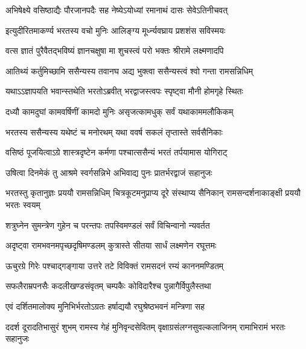 \twolineshloka
{अभिषेक्ष्ये वसिष्ठाद्यैः पौरजानपदैः सह}
{नेष्येऽयोध्यां रमानाथं दासः सेवेऽतिनीचवत्} %

\twolineshloka
{इत्युदीरितमाकर्ण्य भरतस्य वचो मुनिः}
{आलिङ्ग्य मूर्ध्न्यवघ्राय प्रशशंस सविस्मयः} %

\twolineshloka
{वत्स ज्ञातं पुरैवैतद्भविष्यं ज्ञानचक्षुषा}
{मा शुचस्त्वं परो भक्तः श्रीरामे लक्ष्मणादपि} %

\twolineshloka
{आतिथ्यं कर्तुमिच्छामि ससैन्यस्य तवानघ}
{अद्य भुक्त्वा ससैन्यस्त्वं श्वो गन्ता रामसन्निधिम्} %

\twolineshloka
{यथाऽऽज्ञापयति भवान्स्तथेति भरतोऽब्रवीत्}
{भरद्वाजस्त्वपः स्पृष्ट्वा मौनी होमगृहे स्थितः} %

\twolineshloka
{दध्यौ कामदुघां कामवर्षिणीं कामदो मुनिः}
{असृजत्कामधुक् सर्वं यथाकाममलौकिकम्} %

\twolineshloka
{भरतस्य ससैन्यस्य यथेष्टं च मनोरथम्}
{यथा ववर्ष सकलं तृप्तास्ते सर्वसैनिकाः} %

\twolineshloka
{वसिष्ठं पूजयित्वाऽग्रे शास्त्रदृष्टेन कर्मणा}
{पश्चात्ससैन्यं भरतं तर्पयामास योगिराट्} %

\twolineshloka
{उषित्वा दिनमेकं तु आश्रमे स्वर्गसन्निभे}
{अभिवाद्य पुनः प्रातर्भरद्वाजं सहानुजः} %

\threelineshloka
{भरतस्तु कृतानुज्ञः प्रययौ रामसन्निधिम्}
{चित्रकूटमनुप्राप्य दूरे संस्थाप्य सैनिकान्}
{रामसन्दर्शनाकाङ्क्षी प्रययौ भरतः स्वयम्} %

\twolineshloka
{शत्रुघ्नेन सुमन्त्रेण गुहेन च परन्तपः}
{तपस्विमण्डलं सर्वं विचिन्वानो न्यवर्तत} %

\twolineshloka
{अदृष्ट्वा रामभवनमपृच्छदृषिमण्डलम्}
{कुत्रास्ते सीतया सार्धं लक्ष्मणेन रघूत्तमः} %

\twolineshloka
{ऊचुरग्रे गिरेः पश्चाद्गङ्गाया उत्तरे तटे}
{विविक्तं रामसदनं रम्यं काननमण्डितम्} %

\twolineshloka
{सफलैराम्रपनसैः कदलीखण्डसंवृतम्}
{चम्पकैः कोविदारैश्च पुन्नागैर्विपुलैस्तथा} %

\twolineshloka
{एवं दर्शितमालोक्य मुनिभिर्भरतोऽग्रतः}
{हर्षाद्ययौ रघुश्रेष्ठभवनं मन्त्रिणा सह} %

\fourlineindentedshloka
{ददर्श दूरादतिभासुरं शुभम्}
{रामस्य गेहं मुनिवृन्दसेवितम्}
{वृक्षाग्रसंलग्नसुवल्कलाजिनम्}
{रामाभिरामं भरतः सहानुजः} %





